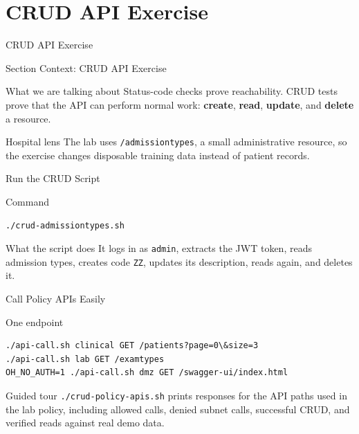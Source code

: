 \documentclass[presentation]{beamer}
\newcommand{\sectiontitleframe}[1]{
\begin{frame}[plain,c]
\begin{center}
{\usebeamerfont{title}\usebeamercolor[fg]{title}#1}
\end{center}
\end{frame}
}
\begin{document}
\section{CRUD API Exercise}
\sectiontitleframe{CRUD API Exercise}

\begin{frame}[c]{Section Context: CRUD API Exercise}
\begin{block}{What we are talking about}
Status-code checks prove reachability. CRUD tests prove that the API can perform normal work:
\textbf{create}, \textbf{read}, \textbf{update}, and \textbf{delete} a resource.
\end{block}

\begin{exampleblock}{Hospital lens}
The lab uses \texttt{/admissiontypes}, a small administrative resource, so the exercise changes
disposable training data instead of patient records.
\end{exampleblock}
\end{frame}

\begin{frame}[fragile,c]{Run the CRUD Script}
\begin{block}{Command}
\begin{verbatim}
./crud-admissiontypes.sh
\end{verbatim}
\end{block}

\begin{exampleblock}{What the script does}
It logs in as \texttt{admin}, extracts the JWT token, reads admission types, creates code
\texttt{ZZ}, updates its description, reads again, and deletes it.
\end{exampleblock}
\end{frame}

\begin{frame}[fragile,c]{Call Policy APIs Easily}
\begin{block}{One endpoint}
\begin{verbatim}
./api-call.sh clinical GET /patients?page=0\&size=3
./api-call.sh lab GET /examtypes
OH_NO_AUTH=1 ./api-call.sh dmz GET /swagger-ui/index.html
\end{verbatim}
\end{block}

\begin{exampleblock}{Guided tour}
\texttt{./crud-policy-apis.sh} prints responses for the API paths used in the lab policy, including
allowed calls, denied subnet calls, successful CRUD, and verified reads against real demo data.
\end{exampleblock}
\end{frame}
\end{document}
